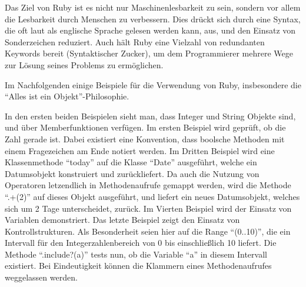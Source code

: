 Das Ziel von Ruby ist es nicht nur Maschinenlesbarkeit zu sein, sondern vor allem die Lesbarkeit durch Menschen zu verbessern. Dies drückt sich durch eine Syntax, die oft laut als englische Sprache gelesen werden kann, aus, und den Einsatz von Sonderzeichen reduziert. Auch hält Ruby eine Vielzahl von redundanten Keywords bereit (Syntaktischer Zucker), um dem Programmierer mehrere Wege zur Lösung seines Problems zu ermöglichen.

\setlength{\epigraphwidth}{\marginparwidth}
\setlength{\epigraphwidth}{0.8\textwidth}

Im Nachfolgenden einige Beispiele für die Verwendung von Ruby, insbesondere die "`Alles ist ein Objekt"'-Philosophie.

 \begin{ruby}[label=Interaktive Ruby Sitzung (IRB)]
    
      
    
     
 \end{ruby}

In den ersten beiden Beispielen sieht man, dass Integer und String Objekte sind, und über Memberfunktionen verfügen. Im ersten Beispiel wird geprüft, ob die Zahl gerade ist. Dabei existiert eine Konvention, dass boolsche Methoden mit einem Fragezeichen am Ende notiert werden. Im Dritten Beispiel wird eine Klassenmethode "`today"' auf die Klasse "`Date"' ausgeführt, welche ein Datumsobjekt konstruiert und zurückliefert. Da auch die Nutzung von Operatoren letzendlich in Methodenaufrufe gemappt werden, wird die Methode "`.+(2)"' auf dieses Objekt ausgeführt, und liefert ein neues Datumsobjekt, welches sich um 2 Tage unterscheidet, zurück.
Im Vierten Beispiel wird der Einsatz von Variablen demonstriert. 
Das letzte Beispiel zeigt den Einsatz von Kontrollstrukturen. Als Besonderheit seien hier auf die Range "`(0..10)"', die ein Intervall für den Integerzahlenbereich von 0 bis einschließlich 10 liefert. Die Methode "`.include?(a)"' tests nun, ob die Variable "`a"' in diesem Intervall existiert. Bei Eindeutigkeit können die Klammern eines Methodenaufrufes weggelassen werden.

